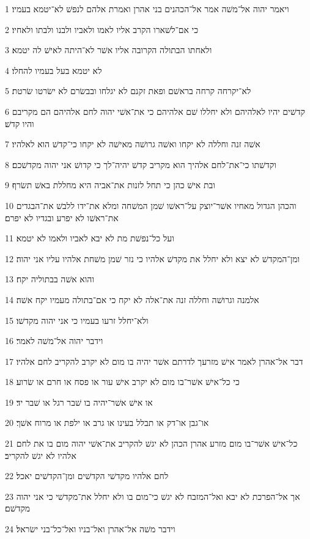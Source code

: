 \par 1 ויאמר יהוה אל־משׁה אמר אל־הכהנים בני אהרן ואמרת אלהם לנפשׁ לא־יטמא בעמיו׃
\par 2 כי אם־לשׁארו הקרב אליו לאמו ולאביו ולבנו ולבתו ולאחיו׃
\par 3 ולאחתו הבתולה הקרובה אליו אשׁר לא־היתה לאישׁ לה יטמא׃
\par 4 לא יטמא בעל בעמיו להחלו׃
\par 5 לא־יקרחה קרחה בראשׁם ופאת זקנם לא יגלחו ובבשׂרם לא ישׂרטו שׂרטת׃
\par 6 קדשׁים יהיו לאלהיהם ולא יחללו שׁם אלהיהם כי את־אשׁי יהוה לחם אלהיהם הם מקריבם והיו קדשׁ׃
\par 7 אשׁה זנה וחללה לא יקחו ואשׁה גרושׁה מאישׁה לא יקחו כי־קדשׁ הוא לאלהיו׃
\par 8 וקדשׁתו כי־את־לחם אלהיך הוא מקריב קדשׁ יהיה־לך כי קדושׁ אני יהוה מקדשׁכם׃
\par 9 ובת אישׁ כהן כי תחל לזנות את־אביה היא מחללת באשׁ תשׂרף׃
\par 10 והכהן הגדול מאחיו אשׁר־יוצק על־ראשׁו שׁמן המשׁחה ומלא את־ידו ללבשׁ את־הבגדים את־ראשׁו לא יפרע ובגדיו לא יפרם׃
\par 11 ועל כל־נפשׁת מת לא יבא לאביו ולאמו לא יטמא׃
\par 12 ומן־המקדשׁ לא יצא ולא יחלל את מקדשׁ אלהיו כי נזר שׁמן משׁחת אלהיו עליו אני יהוה׃
\par 13 והוא אשׁה בבתוליה יקח׃
\par 14 אלמנה וגרושׁה וחללה זנה את־אלה לא יקח כי אם־בתולה מעמיו יקח אשׁה׃
\par 15 ולא־יחלל זרעו בעמיו כי אני יהוה מקדשׁו׃
\par 16 וידבר יהוה אל־משׁה לאמר׃
\par 17 דבר אל־אהרן לאמר אישׁ מזרעך לדרתם אשׁר יהיה בו מום לא יקרב להקריב לחם אלהיו׃
\par 18 כי כל־אישׁ אשׁר־בו מום לא יקרב אישׁ עור או פסח או חרם או שׂרוע׃
\par 19 או אישׁ אשׁר־יהיה בו שׁבר רגל או שׁבר יד׃
\par 20 או־גבן או־דק או תבלל בעינו או גרב או ילפת או מרוח אשׁך׃
\par 21 כל־אישׁ אשׁר־בו מום מזרע אהרן הכהן לא יגשׁ להקריב את־אשׁי יהוה מום בו את לחם אלהיו לא יגשׁ להקריב׃
\par 22 לחם אלהיו מקדשׁי הקדשׁים ומן־הקדשׁים יאכל׃
\par 23 אך אל־הפרכת לא יבא ואל־המזבח לא יגשׁ כי־מום בו ולא יחלל את־מקדשׁי כי אני יהוה מקדשׁם׃
\par 24 וידבר משׁה אל־אהרן ואל־בניו ואל־כל־בני ישׂראל׃

